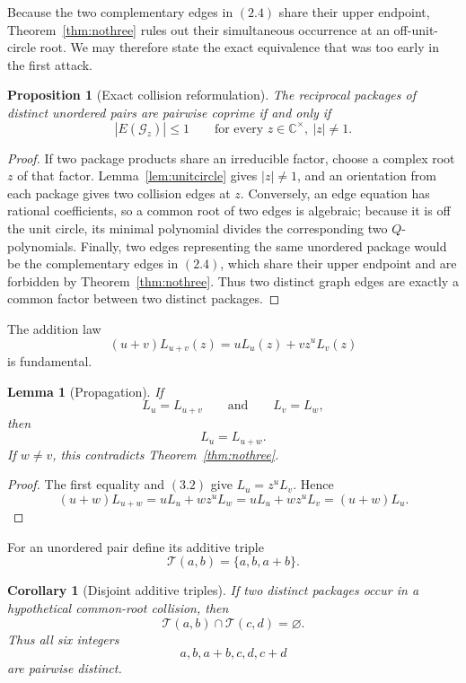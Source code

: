 \documentclass[11pt]{article}
\newtheorem{proposition}[theorem]{Proposition}
\newtheorem{lemma}[theorem]{Lemma}
\newtheorem{corollary}[theorem]{Corollary}
\theoremstyle{definition}
\newcommand{\C}{\mathbb C}
\newcommand{\T}{\mathcal T}
\begin{document}
Because the two complementary edges in \((2.4)\) share their upper endpoint,
Theorem~\ref{thm:nothree} rules out their simultaneous occurrence at an
off-unit-circle root.  We may therefore state the exact equivalence that was too early
in the first attack.

\begin{proposition}[Exact collision reformulation]\label{prop:equivalence}
The reciprocal packages of distinct unordered pairs are pairwise coprime if
and only if
\[
 |E(\mathcal G_z)|\leq1
 \qquad\text{for every }z\in\C^\times,\ \lvert z\rvert\neq1.
 \tag{3.1}
\]
\end{proposition}

\begin{proof}
If two package products share an irreducible factor, choose a complex root
\(z\) of that factor.  Lemma~\ref{lem:unitcircle} gives \(|z|\neq1\), and
an orientation from each package gives two collision edges at \(z\).
Conversely, an edge equation has rational coefficients, so a common root of
two edges is algebraic; because it is off the unit circle, its minimal
polynomial divides the corresponding two \(Q\)-polynomials.  Finally, two
edges representing the same unordered package would be the complementary
edges in \((2.4)\), which share their upper endpoint and are forbidden by
Theorem~\ref{thm:nothree}.  Thus two distinct graph edges are exactly a common
factor between two distinct packages.
\end{proof}

The addition law
\begin{equation}
 (u+v)L_{u+v}(z)=uL_u(z)+vz^uL_v(z)
 \tag{3.2}
\end{equation}
is fundamental.

\begin{lemma}[Propagation]\label{lem:propagation}
If
\[
 L_u=L_{u+v}
 \qquad\text{and}\qquad
 L_v=L_w,
\]
then
\[
 L_u=L_{u+w}.
\]
If \(w\neq v\), this contradicts Theorem~\ref{thm:nothree}.
\end{lemma}

\begin{proof}
The first equality and \((3.2)\) give \(L_u=z^uL_v\).  Hence
\[
 (u+w)L_{u+w}=uL_u+wz^uL_w
 =uL_u+wz^uL_v=(u+w)L_u.
\]
\end{proof}

For an unordered pair define its additive triple
\[
 \T(a,b)=\{a,b,a+b\}.
\]

\begin{corollary}[Disjoint additive triples]\label{cor:triples}
If two distinct packages occur in a hypothetical common-root collision, then
\begin{equation}
 \T(a,b)\cap\T(c,d)=\varnothing.
 \tag{3.3}
\end{equation}
Thus all six integers
\[
 a,b,a+b,c,d,c+d
\]
are pairwise distinct.
\end{corollary}
\end{document}
